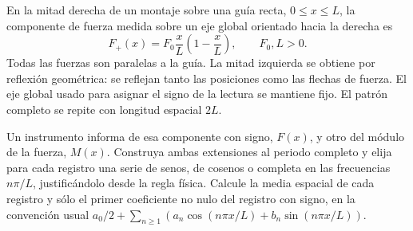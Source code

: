 En la mitad derecha de un montaje sobre una guía recta, \(0\le x\le L\), la componente de fuerza medida sobre un eje global orientado hacia la derecha es
\[
F_+(x)=F_0\frac{x}{L}\left(1-\frac{x}{L}\right),
\qquad F_0,L>0.
\]
Todas las fuerzas son paralelas a la guía. La mitad izquierda se obtiene por reflexión geométrica: se reflejan tanto las posiciones como las flechas de fuerza. El eje global usado para asignar el signo de la lectura se mantiene fijo. El patrón completo se repite con longitud espacial \(2L\).

Un instrumento informa de esa componente con signo, \(F(x)\), y otro del módulo de la fuerza, \(M(x)\). Construya ambas extensiones al periodo completo y elija para cada registro una serie de senos, de cosenos o completa en las frecuencias \(n\pi/L\), justificándolo desde la regla física. Calcule la media espacial de cada registro y sólo el primer coeficiente no nulo del registro con signo, en la convención usual \(a_0/2+\sum_{n\ge1}(a_n\cos(n\pi x/L)+b_n\sin(n\pi x/L))\).
